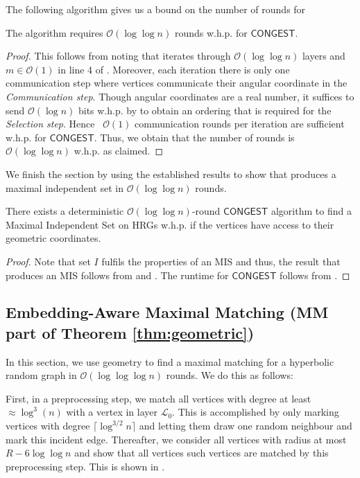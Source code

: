 \documentclass[letterpaper,11pt]{article}
\newcommand{\whp}{w.h.p.\xspace}
\newcommand{\1}{\mathbb I}
\newcommand{\bigO}{\mathcal{O}}
\newcommand{\CONGEST}{\ensuremath{\mathsf{CONGEST}}\xspace}
\newcommand{\Layer}[1]{\mathcal{L}_{#1}}
\begin{document}
%
The following algorithm gives us a bound on the number of rounds for \algomis
%
\begin{lemma}\label{lem:onion-mis-run}
    The algorithm \algomis requires $\bigO(\log \log n)$ rounds \whp for \CONGEST.
\end{lemma}
%
\begin{proof}
This follows from noting that \algomis iterates through $\bigO(\log\log n)$ layers and $m \in \bigO(1)$ in line 4 of . Moreover, each iteration there is only one communication step where vertices communicate their angular coordinate in the \emph{Communication step}. Though angular coordinates are a real number, it suffices to send $\bigO(\log n)$ bits \whp by  to obtain an ordering that is required for the \emph{Selection step}. Hence \ $\bigO(1)$ communication rounds per iteration are sufficient \whp for \CONGEST. Thus, we obtain that the number of rounds is $\bigO(\log\log n)$ \whp as claimed.
\end{proof}
%
We finish the section by using the established results to show that \algomis produces a maximal independent set in $\bigO(\log\log n)$ rounds.
%
\begin{proposition}
    There exists a deterministic $\bigO(\log\log n)$-round \CONGEST algorithm to find a Maximal Independent Set on HRGs \whp if the vertices have access to their geometric coordinates.
\end{proposition}
%
\begin{proof}
Note that set $I$ fulfils the properties of an MIS and thus, the result that \algomis produces an MIS follows from  and . The runtime for \CONGEST follows from .
\end{proof}
%
\subsection{Embedding-Aware Maximal Matching (MM part of Theorem \ref{thm:geometric})}\label{sec:mm_geom}
In this section, we use geometry to find a maximal matching for a hyperbolic random graph in $\bigO(\log\log\log n)$ rounds. We do this as follows:

First, in a preprocessing step, we match all vertices with degree at least $\approx \log^3(n)$ with a vertex in layer $\Layer{0}$. This is accomplished by only marking vertices with degree $\lceil\log^{3/2} n\rceil$ and letting them draw one random neighbour and mark this incident edge. Thereafter, we consider all vertices with radius at most $R - 6\log\log n$ and show that all vertices such vertices are matched by this preprocessing step.  This is shown in .
\end{document}

